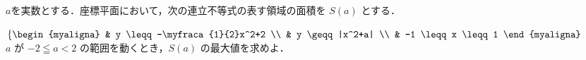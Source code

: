 ﻿\documentclass[../../../uem_mat_tok_q.tex]{subfiles}
\begin{document}
    $a$を実数とする．座標平面において，次の連立不等式の表す領域の面積を $S(a)$ とする．

    \myspaceb%
    $\displaystyle%
        \left\{%
        \begin{myaligna}
            & y \leqq -\myfraca{1}{2}x^2+2 \\
            & y \geqq |x^2+a| \\
            & -1 \leqq x \leqq 1
        \end{myaligna}%
        \right.
    $\\
    $a$ が $-2\leqq a<2$ の範囲を動くとき，$S(a)$ の最大値を求めよ．
\end{document}
